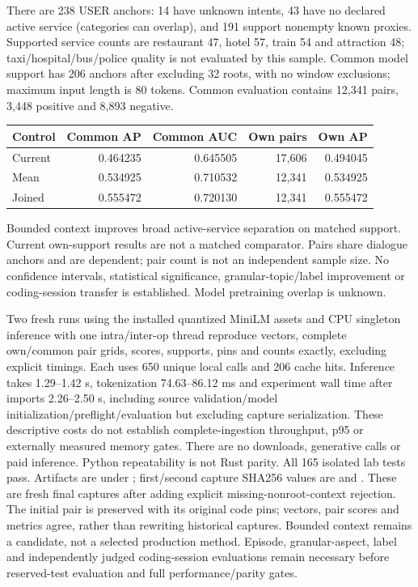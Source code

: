 \documentclass[11pt]{article}
\begin{document}
There are 238 USER anchors: 14 have unknown intents, 43 have no declared active
service (categories can overlap), and 191 support nonempty known proxies.
Supported service counts are restaurant 47, hotel 57, train 54 and attraction 48;
taxi/hospital/bus/police quality is not evaluated by this sample. Common model
support has 206 anchors after excluding 32 roots, with no window exclusions;
maximum input length is 80 tokens. Common evaluation contains 12,341 pairs,
3,448 positive and 8,893 negative.

\begin{center}
\begin{tabular}{lrrrr}
\toprule
Control & Common AP & Common AUC & Own pairs & Own AP \\
\midrule
Current & 0.464235 & 0.645505 & 17,606 & 0.494045 \\
Mean & 0.534925 & 0.710532 & 12,341 & 0.534925 \\
Joined & 0.555472 & 0.720130 & 12,341 & 0.555472 \\
\bottomrule
\end{tabular}
\end{center}
Bounded context improves broad active-service separation on matched support.
Current own-support results are not a matched comparator. Pairs share dialogue
anchors and are dependent; pair count is not an independent sample size. No
confidence intervals, statistical significance, granular-topic/label improvement
or coding-session transfer is established. Model pretraining overlap is unknown.

Two fresh runs using the installed quantized MiniLM assets and CPU singleton
inference with one intra/inter-op thread reproduce vectors, complete own/common
pair grids, scores, supports, pins and counts exactly, excluding explicit timings.
Each uses 650 unique local calls and 206 cache hits. Inference takes
1.29--1.42 s, tokenization 74.63--86.12 ms and experiment wall time after imports
2.26--2.50 s, including source validation/model initialization/preflight/evaluation
but excluding capture serialization. These descriptive costs do not establish
complete-ingestion throughput, p95 or externally measured memory gates. There
are no downloads, generative calls or paid inference. Python repeatability is not
Rust parity. All 165 isolated lab tests pass. Artifacts are under
; first/second capture SHA256 values are
and .
These are fresh final captures after adding explicit missing-nonroot-context
rejection. The initial pair is preserved with its original code pins; vectors,
pair scores and metrics agree, rather than rewriting historical captures.
Bounded context remains a candidate, not a selected production method. Episode,
granular-aspect, label and independently judged coding-session evaluations remain
necessary before reserved-test evaluation and full performance/parity gates.
\end{document}
